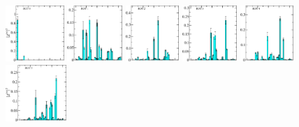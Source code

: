\begin{figure}[H]
    \includegraphics[width=0.1975\textwidth]{figures/sigmas/hg/zfactors/zfactor_isotriplet-S-1-P000-Hg_1-ROT-0.pdf}
    \includegraphics[width=0.185\textwidth]{figures/sigmas/hg/zfactors/zfactor_isotriplet-S-1-P000-Hg_1-ROT-1.pdf}
    \includegraphics[width=0.18\textwidth]{figures/sigmas/hg/zfactors/zfactor_isotriplet-S-1-P000-Hg_1-ROT-2.pdf}
    \includegraphics[width=0.185\textwidth]{figures/sigmas/hg/zfactors/zfactor_isotriplet-S-1-P000-Hg_1-ROT-3.pdf}
    \includegraphics[width=0.18\textwidth]{figures/sigmas/hg/zfactors/zfactor_isotriplet-S-1-P000-Hg_1-ROT-4.pdf}\\
    \hspace*{-0.1cm}\includegraphics[width=0.205\textwidth]{figures/sigmas/hg/zfactors/zfactor_isotriplet-S-1-P000-Hg_1-ROT-5.pdf}

\end{figure}
